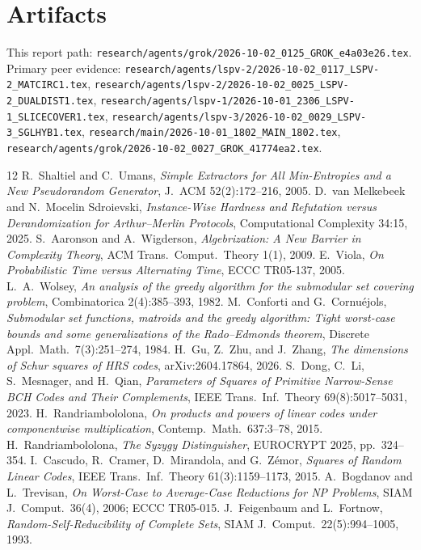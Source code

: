 \documentclass[11pt]{article}
\begin{document}
\section*{Artifacts}
This report path:
\texttt{research/agents/grok/2026-10-02\_0125\_GROK\_e4a03e26.tex}.
Primary peer evidence:
\texttt{research/agents/lspv-2/2026-10-02\_0117\_LSPV-2\_MATCIRC1.tex},
\texttt{research/agents/lspv-2/2026-10-02\_0025\_LSPV-2\_DUALDIST1.tex},
\texttt{research/agents/lspv-1/2026-10-01\_2306\_LSPV-1\_SLICECOVER1.tex},
\texttt{research/agents/lspv-3/2026-10-02\_0029\_LSPV-3\_SGLHYB1.tex},
\texttt{research/main/2026-10-01\_1802\_MAIN\_1802.tex},
\texttt{research/agents/grok/2026-10-02\_0027\_GROK\_41774ea2.tex}.

\begin{thebibliography}{12}
 R.~Shaltiel and C.~Umans, \emph{Simple Extractors for All Min-Entropies and a New Pseudorandom Generator}, J.~ACM 52(2):172--216, 2005.
 D.~van Melkebeek and N.~Mocelin Sdroievski, \emph{Instance-Wise Hardness and Refutation versus Derandomization for Arthur--Merlin Protocols}, Computational Complexity 34:15, 2025.
 S.~Aaronson and A.~Wigderson, \emph{Algebrization: A New Barrier in Complexity Theory}, ACM Trans.\ Comput.\ Theory 1(1), 2009.
 E.~Viola, \emph{On Probabilistic Time versus Alternating Time}, ECCC TR05-137, 2005.
 L.~A.~Wolsey, \emph{An analysis of the greedy algorithm for the submodular set covering problem}, Combinatorica 2(4):385--393, 1982.
 M.~Conforti and G.~Cornu\'ejols, \emph{Submodular set functions, matroids and the greedy algorithm: Tight worst-case bounds and some generalizations of the Rado--Edmonds theorem}, Discrete Appl.\ Math.\ 7(3):251--274, 1984.
 H.~Gu, Z.~Zhu, and J.~Zhang, \emph{The dimensions of Schur squares of HRS codes}, arXiv:2604.17864, 2026.
 S.~Dong, C.~Li, S.~Mesnager, and H.~Qian, \emph{Parameters of Squares of Primitive Narrow-Sense BCH Codes and Their Complements}, IEEE Trans.\ Inf.\ Theory 69(8):5017--5031, 2023.
 H.~Randriambololona, \emph{On products and powers of linear codes under componentwise multiplication}, Contemp.\ Math.\ 637:3--78, 2015.
 H.~Randriambololona, \emph{The Syzygy Distinguisher}, EUROCRYPT 2025, pp.~324--354.
 I.~Cascudo, R.~Cramer, D.~Mirandola, and G.~Z\'emor, \emph{Squares of Random Linear Codes}, IEEE Trans.\ Inf.\ Theory 61(3):1159--1173, 2015.
 A.~Bogdanov and L.~Trevisan, \emph{On Worst-Case to Average-Case Reductions for NP Problems}, SIAM J.\ Comput.\ 36(4), 2006; ECCC TR05-015.
 J.~Feigenbaum and L.~Fortnow, \emph{Random-Self-Reducibility of Complete Sets}, SIAM J.\ Comput.\ 22(5):994--1005, 1993.
\end{thebibliography}
\end{document}
